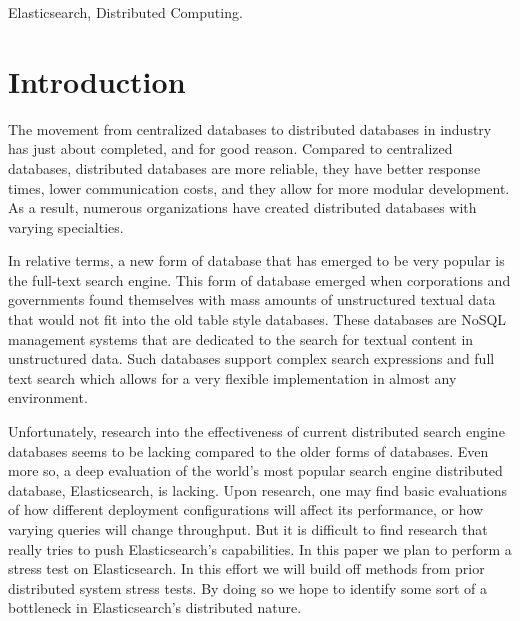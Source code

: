 \documentclass[journal]{IEEEtran}
\begin{document}
\begin{IEEEkeywords}
Elasticsearch, Distributed Computing.
\end{IEEEkeywords}






%
\IEEEpeerreviewmaketitle



\section{Introduction}

The movement from centralized databases to distributed databases in industry has just about completed, and for good reason. Compared to centralized databases, distributed databases are more reliable, they have better response times, lower communication costs, and they allow for more modular development. As a result, numerous organizations have created distributed databases with varying specialties.

In relative terms, a new form of database that has emerged to be very popular is the full-text search engine. This form of database emerged when corporations and governments found themselves with mass amounts of unstructured textual data that would not fit into the old table style databases\cite{bennet_2018}. These databases are NoSQL management systems that are dedicated to the search for textual content in unstructured data. Such databases support complex search expressions and full text search which allows for a very flexible implementation in almost any environment.

Unfortunately, research into the effectiveness of current distributed search engine databases seems to be lacking compared to the older forms of databases. Even more so, a deep evaluation of the world's most popular search engine distributed database, Elasticsearch, is lacking. Upon research, one may find basic evaluations of how different deployment configurations will affect its performance\cite{berger_2018}, or how varying queries will change throughput. But it is difficult to find research that really tries to push Elasticsearch’s capabilities. In this paper we plan to perform a stress test on Elasticsearch. In this effort we will build off methods from prior distributed system stress tests. By doing so we hope to identify some sort of a bottleneck in Elasticsearch's distributed nature.
\end{document}
